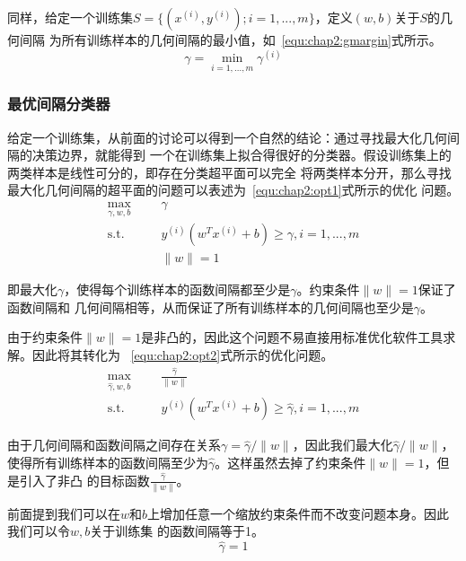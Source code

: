 同样，给定一个训练集$S=\{(x^{(i)},y^{(i)});i=1,...,m\}$，定义$(w,b)$关于$S$的几何间隔
为所有训练样本的几何间隔的最小值，如~\ref{equ:chap2:gmargin}式所示。
\begin{equation}
  \label{equ:chap2:gmargin}
  \gamma=\min_{i=1,...,m}\gamma^{(i)}
\end{equation}

\subsubsection{最优间隔分类器}

给定一个训练集，从前面的讨论可以得到一个自然的结论：通过寻找最大化几何间隔的决策边界，就能得到
一个在训练集上拟合得很好的分类器。假设训练集上的两类样本是线性可分的，即存在分类超平面可以完全
将两类样本分开，那么寻找最大化几何间隔的超平面的问题可以表述为~\ref{equ:chap2:opt1}式所示的优化
问题。
\begin{equation}
  \label{equ:chap2:opt1}
  \begin{aligned}
    \max_{\gamma,w,b} &
    & & \gamma \\
    \text{s.t.} &
    & & y^{(i)}\left(w^Tx^{(i)}+b\right)\geq \gamma, i=1,...,m \\
    \quad &
    & & \|w\|=1
  \end{aligned}
\end{equation}

即最大化$\gamma$，使得每个训练样本的函数间隔都至少是$\gamma$。约束条件$\|w\|=1$保证了函数间隔和
几何间隔相等，从而保证了所有训练样本的几何间隔也至少是$\gamma$。

由于约束条件$\|w\|=1$是非凸的，因此这个问题不易直接用标准优化软件工具求解。因此将其转化为
~\ref{equ:chap2:opt2}式所示的优化问题。
\begin{equation}
  \label{equ:chap2:opt2}
  \begin{aligned}
    \max_{\hat{\gamma},w,b} &
    & & \frac{\hat{\gamma}}{\|w\|} \\
    \text{s.t.} &
    & & y^{(i)}\left(w^Tx^{(i)}+b\right)\geq \hat{\gamma}, i=1,...,m
  \end{aligned}
\end{equation}

由于几何间隔和函数间隔之间存在关系$\gamma=\hat{\gamma}/\|w\|$，因此我们最大化$\hat{\gamma}/\|w\|$，
使得所有训练样本的函数间隔至少为$\hat{\gamma}$。这样虽然去掉了约束条件$\|w\|=1$，但是引入了非凸
的目标函数$\frac{\hat{\gamma}}{\|w\|}$。

前面提到我们可以在$w$和$b$上增加任意一个缩放约束条件而不改变问题本身。因此我们可以令$w,b$关于训练集
的函数间隔等于1。
\begin{equation}
  \label{equ:chap2:constrain}
  \hat{\gamma} = 1
\end{equation}

